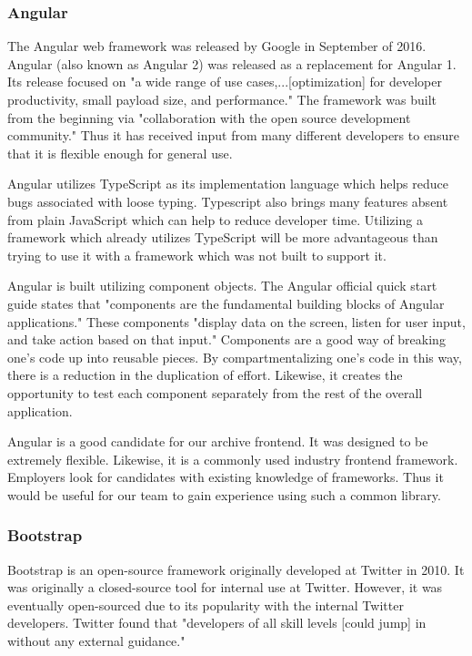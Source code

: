 \documentclass[12pt]{report}
\begin{document}
\subsubsection*{Angular}

The Angular web framework was released by Google in September of 2016.\cite{angularrelease} Angular (also known as Angular 2) was released as a replacement for Angular 1. Its release focused on "a wide range of use cases,...[optimization] for developer productivity, small payload size, and performance."\cite{angularrelease} The framework was built from the beginning via "collaboration with the open source development community."\cite{angularrelease} Thus it has received input from many different developers to ensure that it is flexible enough for general use.

Angular utilizes TypeScript as its implementation language which helps reduce bugs associated with loose typing. Typescript also brings many features absent from plain JavaScript which can help to reduce developer time. Utilizing a framework which already utilizes TypeScript will be more advantageous than trying to use it with a framework which was not built to support it.

Angular is built utilizing component objects. The Angular official quick start guide states that "components are the fundamental building blocks of Angular applications."\cite{angularquickstart} These components "display data on the screen, listen for user input, and take action based on that input."\cite{angularquickstart} Components are a good way of breaking one's code up into reusable pieces. By compartmentalizing one's code in this way, there is a reduction in the duplication of effort. Likewise, it creates the opportunity to test each component separately from the rest of the overall application.

Angular is a good candidate for our archive frontend. It was designed to be extremely flexible. Likewise, it is a commonly used industry frontend framework. Employers look for candidates with existing knowledge of frameworks. Thus it would be useful for our team to gain experience using such a common library.

\subsubsection*{Bootstrap}

Bootstrap is an open-source framework originally developed at Twitter in 2010.\cite{bootstrapabout} It was originally a closed-source tool for internal use at Twitter. However, it was eventually open-sourced due to its popularity with the internal Twitter developers. Twitter found that "developers of all skill levels [could jump] in without any external guidance."\cite{bootstrapabout}
\end{document}
